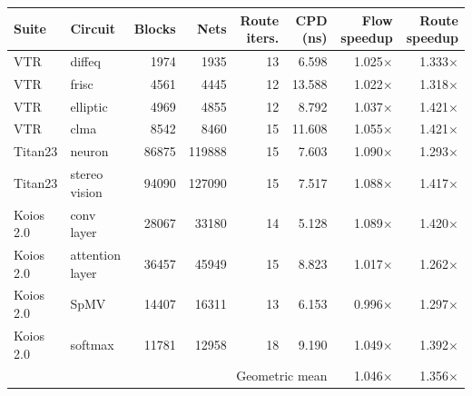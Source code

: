 \begin{tabular}{llrrrrrr}
\toprule
Suite & Circuit & Blocks & Nets & Route iters. & CPD (ns) & Flow speedup & Route speedup \\
\midrule
VTR & diffeq & 1974 & 1935 & 13 & 6.598 & 1.025$\times$ & 1.333$\times$ \\
VTR & frisc & 4561 & 4445 & 12 & 13.588 & 1.022$\times$ & 1.318$\times$ \\
VTR & elliptic & 4969 & 4855 & 12 & 8.792 & 1.037$\times$ & 1.421$\times$ \\
VTR & clma & 8542 & 8460 & 15 & 11.608 & 1.055$\times$ & 1.421$\times$ \\
Titan23 & neuron & 86875 & 119888 & 15 & 7.603 & 1.090$\times$ & 1.293$\times$ \\
Titan23 & stereo vision & 94090 & 127090 & 15 & 7.517 & 1.088$\times$ & 1.417$\times$ \\
Koios 2.0 & conv layer & 28067 & 33180 & 14 & 5.128 & 1.089$\times$ & 1.420$\times$ \\
Koios 2.0 & attention layer & 36457 & 45949 & 15 & 8.823 & 1.017$\times$ & 1.262$\times$ \\
Koios 2.0 & SpMV & 14407 & 16311 & 13 & 6.153 & 0.996$\times$ & 1.297$\times$ \\
Koios 2.0 & softmax & 11781 & 12958 & 18 & 9.190 & 1.049$\times$ & 1.392$\times$ \\
\midrule
\multicolumn{6}{r}{Geometric mean} & 1.046$\times$ & 1.356$\times$ \\
\bottomrule
\end{tabular}
